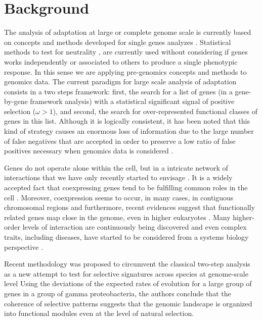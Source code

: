 

\section{Background}

The analysis of adaptation at large or complete genome scale is currently based on concepts and methods developed for single genes analyzes \cite{Arbiza2006,Bakewell2007,Bustamante2005,Clark2003,Nielsen2005}. Statistical methods to test for neutrality \cite{Nielsen2001}, are currently used without considering if genes works independently or associated to others to produce a single phenotypic response. In this sense we are applying pre-genomics concepts and methods to genomics data. The current paradigm for large scale analysis of adaptation consists in a two steps framework: first, the search for a list of genes (in a gene-by-gene framework analysis) with a statistical significant signal of positive selection ($\omega > 1$), and second, the search for over-represented functional classes of genes in this list. Although it is logically consistent, it has been noted that this kind of strategy causes an enormous loss of information due to the large number of false negatives that are accepted in order to preserve a low ratio of false positives necessary when genomics data is considered \cite{Al-Shahrour2007,Al-Shahrour2005a,Al-Shahrour2006,Subramanian2005}.

Genes do not operate alone within the cell, but in a intricate network of interactions that we have only recently started to envisage \cite{Stelzl2005}. It is a widely accepted fact that coexpressing genes tend to be fulfilling common roles in the cell \cite{Lee2003}. Moreover, coexpression seems to occur, in many cases, in contiguous chromosomal regions \cite{Caron2001} and furthermore, recent evidences suggest that functionally related genes map close in the genome, even in higher eukaryotes \cite{Hurst2004}. Many higher-order levels of interaction are continuously being discovered and even complex traits, including diseases, have started to be considered from a systems biology perspective \cite{Ideker2008,Vamathevan2008}.

Recent methodology was proposed to circumvent the classical two-step analysis as a new attempt to test for selective signatures across species at genome-scale level \cite{Shapiro2008} Using the deviations of the expected rates of evolution for a large group of genes in a group of gamma proteobacteria, the authors conclude that the coherence of selective patterns suggests that the genomic landscape is organized into functional modules even at the level of natural selection.

